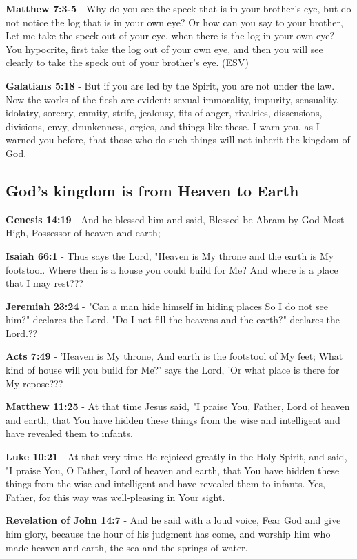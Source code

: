 \documentclass[11pt]{article}
\begin{document}
\textbf{Matthew 7:3-5} - Why do you see the speck that is in your brother's eye, but do not notice the log that is in your own eye? Or how can you say to your brother, Let me take the speck out of your eye, when there is the log in your own eye? You hypocrite, first take the log out of your own eye, and then you will see clearly to take the speck out of your brother's eye. (ESV)

\textbf{Galatians 5:18} - But if you are led by the Spirit, you are not under the law. Now the works of the flesh are evident: sexual immorality, impurity, sensuality, idolatry, sorcery, enmity, strife, jealousy, fits of anger, rivalries, dissensions, divisions, envy, drunkenness, orgies, and things like these. I warn you, as I warned you before, that those who do such things will not inherit the kingdom of God.

\subsection{God's kingdom is from Heaven to Earth}
\label{sec:org219b497}
\textbf{Genesis 14:19} - And he blessed him and said, Blessed be Abram by God Most High, Possessor of heaven and earth;

\textbf{Isaiah 66:1} - Thus says the Lord, "Heaven is My throne and the earth is My footstool. Where then is a house you could build for Me? And where is a place that I may rest???

\textbf{Jeremiah 23:24} - "Can a man hide himself in hiding places So I do not see him?" declares the Lord. "Do I not fill the heavens and the earth?" declares the Lord.??

\textbf{Acts 7:49} - 'Heaven is My throne, And earth is the footstool of My feet; What kind of house will you build for Me?' says the Lord, 'Or what place is there for My repose???

\textbf{Matthew 11:25} - At that time Jesus said, "I praise You, Father, Lord of heaven and earth, that You have hidden these things from the wise and intelligent and have revealed them to infants.

\textbf{Luke 10:21} - At that very time He rejoiced greatly in the Holy Spirit, and said, "I praise You, O Father, Lord of heaven and earth, that You have hidden these things from the wise and intelligent and have revealed them to infants. Yes, Father, for this way was well-pleasing in Your sight.

\textbf{Revelation of John 14:7} - And he said with a loud voice, Fear God and give him glory, because the hour of his judgment has come, and worship him who made heaven and earth, the sea and the springs of water.
\end{document}
